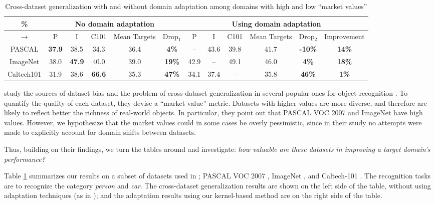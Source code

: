 {\begin{table}[t]
  \centering
  \caption{Cross-dataset generalization with and without domain adaptation among domains with high and low ``market values'' \cite{TorralbaCVPR11Unbiased} } \label{tRevisit}
  \begin{tabular}{|c|ccc|c|c||ccc|c|c|c|}
    \hline
    \% & \multicolumn{5}{|c||}{No domain adaptation}  & \multicolumn{6}{|c|}{Using domain adaptation} \\ \hline
    $\rightarrow$ & P & I & C101 &  Mean Targets & Drop$_1$ & P & I & C101 & Mean Targets  & Drop$_2$ & Improvement \\ \hline \hline
    PASCAL & \textbf{37.9} & 38.5 & 34.3 &  36.4 & \textbf{4\%}         & -- & 43.6 & 39.8 & 41.7 & \textbf{-10\%} &\textbf{14\%} \\ \hline
    ImageNet & 38.0 & \textbf{47.9} & 40.0 & 39.0 & \textbf{19\%}          & 42.9 & -- & 49.1 & 46.0 & \textbf{4\%} &\textbf{18\%} \\ \hline
    Caltech101 & 31.9 & 38.6 & \textbf{66.6} &  35.3 & \textbf{47\%}          & 34.1 & 37.4 & -- & 35.8 & \textbf{46\%} &\textbf{1\%} \\
    \hline
  \end{tabular}
 \end{table}


\citet{TorralbaCVPR11Unbiased} study the sources of dataset bias and the problem of cross-dataset generalization in several popular ones for object recognition \cite{TorralbaCVPR11Unbiased}. To quantify the quality of each dataset, they devise a ``market value'' metric. Datasets with higher values are more diverse, and therefore are likely to reflect better the richness of real-world objects. In particular, they point out that PASCAL VOC 2007 and ImageNet have high values.  However, we hypothesize that the market values could in some cases be overly pessimistic, since in their study no attempts were made to explicitly account for domain shifts between datasets.

Thus, building on their findings, we turn the tables around and investigate: \emph{how valuable are these  datasets  in improving a target domain's performance?}

Table \ref{tRevisit} summarizes our results on a subset of datasets used in \cite{TorralbaCVPR11Unbiased}; PASCAL VOC 2007 \cite{pascal-voc-2007}, ImageNet \cite{DengCVPR09Imagenet}, and Caltech-101 \cite{fei2007learning}.  The recognition tasks are to recognize the category \emph{person} and \emph{car}.
The cross-dataset generalization results are shown on the left side of the table, without using adaptation techniques (as in \cite{TorralbaCVPR11Unbiased});  and the adaptation results using our kernel-based method are on the right side of the table.

}
